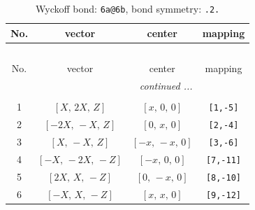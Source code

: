 \documentclass[fleqn,8pt]{jsarticle}
\begin{document}
\begin{longtable}{cccc}
\caption{Wyckoff bond: {\tt 6a@6b}, bond symmetry: {\tt .2.}}
 \\
 \hline \hline
No. & vector & center & mapping \\ \hline \endfirsthead

\multicolumn{3}{l}{\tablename\ \thetable{}} \\
 \hline \hline
No. & vector & center & mapping \\ \hline \endhead

 \hline \hline
\multicolumn{3}{r}{\footnotesize\it continued ...} \\ \endfoot

 \hline \hline
\multicolumn{3}{r}{} \\ \endlastfoot

1 & $\left[ X,\, 2 X,\, Z \right]$ & $\left[ x,\, 0,\, 0 \right]$ & {\tt [1,-5]} \\ \hline
2 & $\left[ - 2 X,\, - X,\, Z \right]$ & $\left[ 0,\, x,\, 0 \right]$ & {\tt [2,-4]} \\ \hline
3 & $\left[ X,\, - X,\, Z \right]$ & $\left[ - x,\, - x,\, 0 \right]$ & {\tt [3,-6]} \\ \hline
4 & $\left[ - X,\, - 2 X,\, - Z \right]$ & $\left[ - x,\, 0,\, 0 \right]$ & {\tt [7,-11]} \\ \hline
5 & $\left[ 2 X,\, X,\, - Z \right]$ & $\left[ 0,\, - x,\, 0 \right]$ & {\tt [8,-10]} \\ \hline
6 & $\left[ - X,\, X,\, - Z \right]$ & $\left[ x,\, x,\, 0 \right]$ & {\tt [9,-12]} \\
\end{longtable}
\renewcommand{\arraystretch}{1.2}
\end{document}
